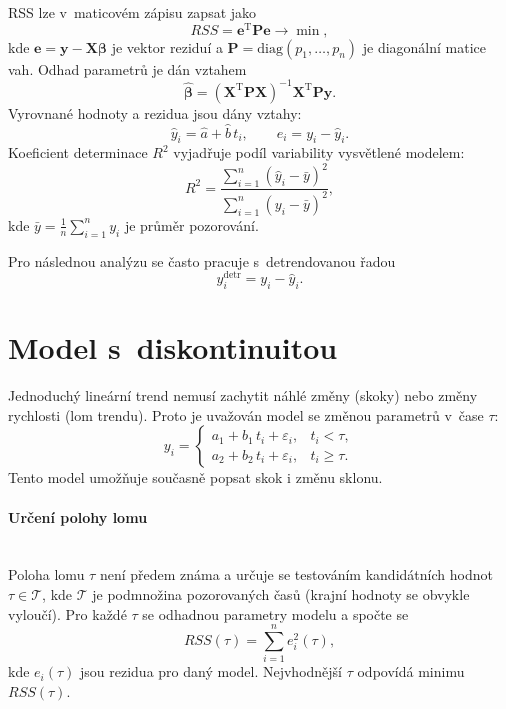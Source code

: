 \noindent RSS lze v~maticovém zápisu zapsat jako
\begin{equation}
RSS = \mathbf{e}^\mathrm{T}\mathbf{P}\mathbf{e} \rightarrow \min,
\label{eq:lsq_matrix}
\end{equation}
kde \(\mathbf{e} = \mathbf{y} - \mathbf{X}\boldsymbol{\beta}\) je vektor reziduí
a \(\mathbf{P} = \mathrm{diag}(p_1,\dots,p_n)\) je diagonální matice vah.
Odhad parametrů je dán vztahem
\begin{equation}
\hat{\boldsymbol{\beta}} = (\mathbf{X}^\mathrm{T}\mathbf{P}\mathbf{X})^{-1}\mathbf{X}^\mathrm{T}\mathbf{P}\mathbf{y}.
\end{equation}
Vyrovnané hodnoty a rezidua jsou dány vztahy:
\begin{equation}
\hat{y}_i=\hat{a}+\hat{b}\,t_i,\qquad
e_i=y_i-\hat{y}_i.
\label{eq:residuals}
\end{equation}
Koeficient determinace \(R^2\) vyjadřuje podíl variability vysvětlené modelem:
\begin{equation}
R^2=\frac{\sum_{i=1}^{n}(\hat{y}_i-\bar{y})^2}{\sum_{i=1}^{n}(y_i-\bar{y})^2},
\label{eq:r2}
\end{equation}
kde \(\bar{y} = \frac{1}{n}\sum_{i=1}^{n}y_i\) je průměr pozorování.

\noindent Pro následnou analýzu se často pracuje s~detrendovanou řadou
\begin{equation}
y^{\mathrm{detr}}_i = y_i - \hat{y}_i.
\label{eq:detrend}
\end{equation}

\section{Model s~diskontinuitou}
\label{3-3-mode-s-diskontinuitou}

Jednoduchý lineární trend nemusí zachytit náhlé změny (skoky) nebo změny rychlosti (lom trendu).
Proto je uvažován model se změnou parametrů v~čase \(\tau\):
\begin{equation}
y_i=
\begin{cases}
a_1+b_1\,t_i+\varepsilon_i, & t_i<\tau,\\
a_2+b_2\,t_i+\varepsilon_i, & t_i\geq\tau.
\end{cases}
\label{eq:2seg_model}
\end{equation}
Tento model umožňuje současně popsat skok i změnu sklonu.

\paragraph{Určení polohy lomu}\leavevmode\\
Poloha lomu \(\tau\) není předem známa a určuje se testováním kandidátních hodnot \(\tau\in\mathcal{T}\),
kde \(\mathcal{T}\) je podmnožina pozorovaných časů (krajní hodnoty se obvykle vyloučí).
Pro každé \(\tau\) se odhadnou parametry modelu a spočte se
\begin{equation}
RSS(\tau)=\sum_{i=1}^{n} e_i^2(\tau),
\label{eq:rss_tau}
\end{equation}
kde \(e_i(\tau)\) jsou rezidua pro daný model. Nejvhodnější \(\tau\) odpovídá minimu \(RSS(\tau)\).


